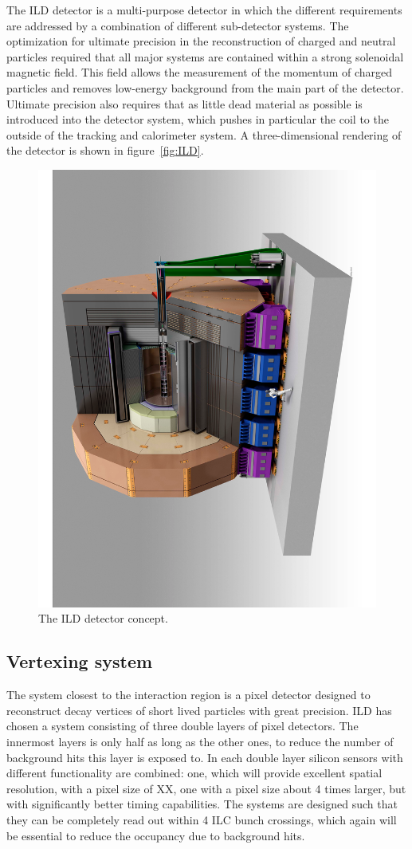 \documentclass[%
 amsmath,amssymb,
 aps,
]{revtex4-1}
\begin{document}
The ILD detector is a multi-purpose detector in which the different requirements are addressed by a combination of different sub-detector systems. The optimization for ultimate precision in the reconstruction of charged and neutral particles required that all major systems are contained within a strong solenoidal magnetic field. This field allows the measurement of the momentum of charged particles and removes low-energy background from the main part of the detector. Ultimate precision also requires that as little dead material as possible is introduced into the detector system, which pushes in particular the coil to the outside of the tracking and calorimeter system. A three-dimensional rendering of the detector is shown in figure~\ref{fig:ILD}.
\begin{figure}[tb]
 \begin{center}
 \includegraphics[width=0.7\hsize,angle=-90]{figures/ILD.pdf}
\caption{The ILD detector concept.
\label{fig_ild}}
 \end{center}
 \end{figure}

 
\subsection{Vertexing system}
The system closest to the interaction region is a pixel detector designed to reconstruct decay vertices of short lived particles with great precision. ILD has chosen a system consisting of three double layers of pixel detectors. The innermost layers is only half as long as the other ones, to reduce the number of background hits this layer is exposed to. In each double layer silicon sensors with different functionality are combined: one, which will provide excellent spatial resolution, with a pixel size of XX, one with a pixel size about 4 times larger, but with significantly better timing capabilities. The systems are designed such that they can be completely read out within 4 ILC bunch crossings, which again will be essential to reduce the occupancy due to background hits. 
\end{document}
